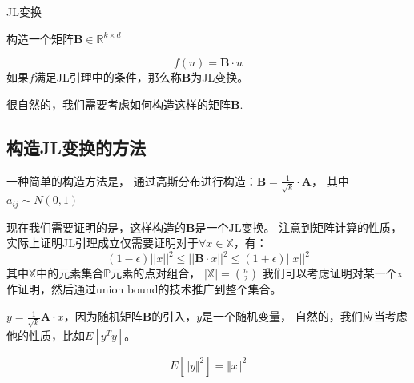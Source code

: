 \documentclass[lang=cn,newtx,10pt,scheme=chinese,chinesefont=nofont,citestyle=gb7714-2015, bibstyle=gb7714-2015]{elegantbook}
\begin{document}
\begin{refsection}
\begin{definition}{JL变换}
	
	构造一个矩阵$\mathbf{B} \in \mathbb{R}^{k \times d}$

	\begin{equation}
		f(u)= \mathbf{B}\cdot u
	\end{equation}
	如果$f$满足JL引理中的条件，那么称$\mathbf{B}$为JL变换。
\end{definition}


很自然的，我们需要考虑如何构造这样的矩阵$\mathbf{B}$.

\subsection{构造JL变换的方法}

一种简单的构造方法是，
通过高斯分布进行构造：$\mathbf{B}=\frac{1}{\sqrt{k}}\cdot \mathbf{A}$，
其中$a_{ij} \sim N(0,1)$

现在我们需要证明的是，这样构造的$\mathbf{B}$是一个JL变换。
注意到矩阵计算的性质，实际上证明JL引理成立仅需要证明对于$\forall x \in \mathbb{{X}}$，有：
\begin{equation}
	(1-\epsilon) ||x||^2 \leq ||\mathbf{B}\cdot x||^2 \leq (1+\epsilon) ||x||^2
\end{equation}
其中$\mathbb{X}$中的元素集合$\mathbb{P}$元素的点对组合，
$|\mathbb{X}|=\binom{n}{2}$
我们可以考虑证明对某一个x作证明，然后通过union bound的技术推广到整个集合。

$y = \frac 1{\sqrt{k}} \mathbf{{A}}\cdot x$，因为随机矩阵$\mathbf{B}$的引入，$y$是一个随机变量，
自然的，我们应当考虑他的性质，比如$E[y^Ty]$。

\begin{lemma}
	\begin{equation*}
		E[\Vert y \Vert^2] = \Vert x \Vert^2
	\end{equation*}
\end{lemma}




\end{refsection}
\end{document}
